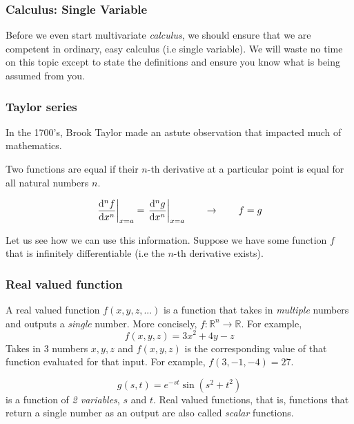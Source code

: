 \documentclass[14pt]{article}
\begin{document}
	\subsubsection{Calculus: Single Variable}
	Before we even start multivariate \textit{calculus}, we should ensure that we are competent in ordinary, easy calculus (i.e single variable). We will waste no time on this topic except to state the definitions and ensure you know what is being assumed from you.
	
	
	\subsubsection{Taylor series}  
	In the 1700's, Brook Taylor made an astute observation that impacted much of mathematics.
	
	\begin{tcolorbox}[colframe=black]
		Two functions are equal if their $n$-th derivative at a particular point is equal for all natural numbers $n$.
		
		\begin{equation*}
			 \odv[order={n}, delims-eval=.|]{f}{x}_{x=a} = \odv[order={n}, delims-eval=.|]{g}{x}_{x=a} \hspace{2em}  \rightarrow \hspace{2em}  f = g  
		\end{equation*}
	\end{tcolorbox}

	Let us see how we can use this information. Suppose we have some function $f$ that is infinitely differentiable (i.e the $n$-th derivative exists). 
	
	
	\subsubsection{Real valued function} 
	A real valued function $f(x, y, z, ...)$ is a function that takes in \textit{multiple} numbers and outputs a \textit{single} number. More concisely, $ f: \mathbb{R}^n \rightarrow \mathbb{R}$. For example,
	\begin{equation*}
		f(x, y, z) = 3x^2 + 4y - z
	\end{equation*}
	Takes in 3 numbers $x, y, z$ and $f(x, y, z)$ is the corresponding value of that function evaluated for that input. For example, $f(3, -1, -4) = 27$.
	
	\begin{equation*}
		g(s, t) = e^{-st}\sin(s^2 + t^2)
	\end{equation*}
	is a function of \textit{2 variables}, $s$ and $t$. Real valued functions, that is, functions that return a single number as an output are also called \textit{scalar} functions. 
	
\end{document}
